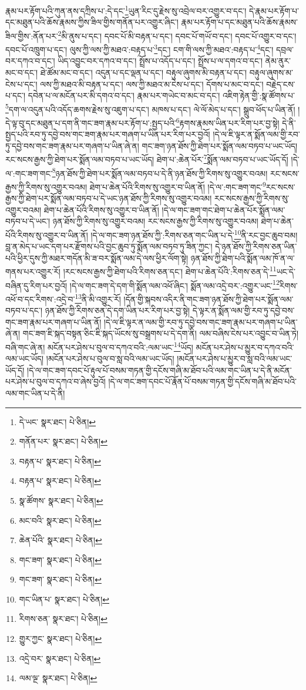 རྣམ་པར་རྟོག་པའི་ཀུན་ནས་དཀྲིས་པ་:དེ་དང་\footnote{དེ་ཡང་  སྣར་ཐང་།  པེ་ཅིན། }ཡུན་རིང་དུ་རྗེས་སུ་འབྲེལ་བར་འགྱུར་བ་དང་། དེ་རྣམ་པར་རྟོག་པ་དང་མཐུན་པའི་ཆོས་རྣམས་ཀྱིས་ཟིལ་གྱིས་གནོན་པར་འགྱུར་ཞིང་། རྣམ་པར་རྟོག་པ་དང་མཐུན་པའི་ཆོས་རྣམས་ཟིལ་གྱིས་:ནོན་པར་\footnote{གནོན་པར་  སྣར་ཐང་།  པེ་ཅིན། }མི་ནུས་པ་དང་། དབང་པོ་མི་བརྟན་པ་དང་། དབང་པོ་གཡོ་བ་དང་། དབང་པོ་འགྱུར་བ་དང་། དབང་པོ་འཁྲུག་པ་དང་། ལུས་ཀྱི་ལས་ཀྱི་མཐའ་:བརྟད་པ་\footnote{བརྟན་པ་  སྣར་ཐང་།  པེ་ཅིན། }དང་། ངག་གི་ལས་ཀྱི་མཐའ་:བརྟད་པ་\footnote{བརྟན་པ་  སྣར་ཐང་།  པེ་ཅིན། }དང་། དབྲལ་བར་དཀའ་བ་དང་། ཡིད་འབྱུང་བར་དཀའ་བ་དང་། སྤྲོས་པ་འདོད་པ་དང་། སྤྲོས་པ་ལ་དགའ་བ་དང་། ནེམ་ནུར་མང་བ་དང་། ཐེ་ཚོམ་མང་བ་དང་། འདུན་པ་དང་ལྡན་པ་དང་། བརྟུལ་ཞུགས་མི་བརྟན་པ་དང་། བརྟུལ་ཞུགས་མ་ངེས་པ་དང་། ལས་ཀྱི་མཐའ་མི་བརྟན་པ་དང་། ལས་ཀྱི་མཐའ་མ་ངེས་པ་དང་། དོགས་པ་མང་བ་དང་། བརྗེད་ངས་པ་དང་། དབེན་པ་ལ་མངོན་པར་མི་དགའ་བ་དང་། རྣམ་པར་གཡེང་བ་མང་བ་དང་། འཇིག་རྟེན་གྱི་:སྣ་ཚོགས་པ་\footnote{སྣ་ཚོགས་  སྣར་ཐང་།  པེ་ཅིན། }དག་ལ་འདུན་པའི་འདོད་ཆགས་རྗེས་སུ་འཇུག་པ་དང་། མཁས་པ་དང་། ལེ་ལོ་མེད་པ་དང་། སྒྲུབ་ཕོད་པ་ཡིན་ནོ། །དེ་ལྟ་བུ་དང་མཐུན་པ་དག་ནི་གང་ཟག་རྣམ་པར་རྟོག་པ་:སྤྱད་པའི་\footnote{མང་བའི་  སྣར་ཐང་།  པེ་ཅིན། }རྟགས་རྣམས་ཡིན་པར་རིག་པར་བྱ་སྟེ། དེ་ནི་སྤྱད་པའི་རབ་ཏུ་དབྱེ་བས་གང་ཟག་རྣམ་པར་གཞག་པ་ཡིན་པར་རིག་པར་བྱའོ། །དེ་ལ་ཇི་ལྟར་ན་སྨོན་ལམ་གྱི་རབ་ཏུ་དབྱེ་བས་གང་ཟག་རྣམ་པར་གཞག་པ་ཡིན་ཞེ་ན། གང་ཟག་ཉན་ཐོས་ཀྱི་ཐེག་པར་སྨོན་ལམ་བཏབ་པ་ཡང་ཡོད། རང་སངས་རྒྱས་ཀྱི་ཐེག་པར་སྨོན་ལམ་བཏབ་པ་ཡང་ཡོད། ཐེག་པ་:ཆེན་པོར་\footnote{ཆེན་པོའི་  སྣར་ཐང་།  པེ་ཅིན། }སྨོན་ལམ་བཏབ་པ་ཡང་ཡོད་དོ། །དེ་ལ་:གང་ཟག་གང་\footnote{གང་ཟག་  སྣར་ཐང་།  པེ་ཅིན། }ཉན་ཐོས་ཀྱི་ཐེག་པར་སྨོན་ལམ་བཏབ་པ་དེ་ནི་ཉན་ཐོས་ཀྱི་རིགས་སུ་འགྱུར་བའམ། རང་སངས་རྒྱས་ཀྱི་རིགས་སུ་འགྱུར་བའམ། ཐེག་པ་ཆེན་པོའི་རིགས་སུ་འགྱུར་བ་ཡིན་ནོ། །དེ་ལ་:གང་ཟག་གང་\footnote{གང་ཟག་  སྣར་ཐང་།  པེ་ཅིན། }རང་སངས་རྒྱས་ཀྱི་ཐེག་པར་སྨོན་ལམ་བཏབ་པ་དེ་ཡང་ཉན་ཐོས་ཀྱི་རིགས་སུ་འགྱུར་བའམ། རང་སངས་རྒྱས་ཀྱི་རིགས་སུ་འགྱུར་བའམ། ཐེག་པ་ཆེན་པོའི་རིགས་སུ་འགྱུར་བ་ཡིན་ནོ། །དེ་ལ་གང་ཟག་གང་ཐེག་པ་ཆེན་པོར་སྨོན་ལམ་བཏབ་པ་དེ་ཡང་། ཉན་ཐོས་ཀྱི་རིགས་སུ་འགྱུར་བའམ། རང་སངས་རྒྱས་ཀྱི་རིགས་སུ་འགྱུར་བའམ། ཐེག་པ་ཆེན་པོའི་རིགས་སུ་འགྱུར་བ་ཡིན་ནོ། །དེ་ལ་གང་ཟག་ཉན་ཐོས་ཀྱི་:རིགས་ཅན་གང་ཡིན་པ་དེ་\footnote{གང་ཡིན་པ་  སྣར་ཐང་།  པེ་ཅིན། }ནི་རང་བྱང་ཆུབ་བམ། བླ་ན་མེད་པ་ཡང་དག་པར་རྫོགས་པའི་བྱང་ཆུབ་ཏུ་སྨོན་ལམ་བཏབ་ཏུ་ཟིན་ཀྱང་། དེ་ཉན་ཐོས་ཀྱི་རིགས་ཅན་ཡིན་པའི་ཕྱིར་དུས་ཀྱི་མཐར་གདོན་མི་ཟ་བར་སྨོན་ལམ་དེ་ལས་ཕྱིར་ལོག་སྟེ། ཉན་ཐོས་ཀྱི་ཐེག་པའི་སྨོན་ལམ་ཁོ་ན་ལ་གནས་པར་འགྱུར་རོ། །རང་སངས་རྒྱས་ཀྱི་ཐེག་པའི་རིགས་ཅན་དང་། ཐེག་པ་ཆེན་པོའི་:རིགས་ཅན་དེ་\footnote{རིགས་ཅན་  སྣར་ཐང་།  པེ་ཅིན། }ཡང་དེ་བཞིན་དུ་རིག་པར་བྱའོ། །དེ་ལ་གང་ཟག་དེ་དག་གི་སྨོན་ལམ་འཕོ་ཞིང་། སྨོན་ལམ་འདྲེ་བར་:འགྱུར་ཡང་\footnote{གྱུར་ཀྱང་  སྣར་ཐང་།  པེ་ཅིན། }རིགས་འཕོ་བ་དང་རིགས་:འདྲེ་བ་\footnote{འདྲེ་བར་  སྣར་ཐང་།  པེ་ཅིན། }ནི་མི་འགྱུར་རོ། །དོན་གྱི་སྐབས་འདིར་ནི་གང་ཟག་ཉན་ཐོས་ཀྱི་ཐེག་པར་སྨོན་ལམ་བཏབ་པ་དང་། ཉན་ཐོས་ཀྱི་རིགས་ཅན་དེ་དག་ཡིན་པར་རིག་པར་བྱ་སྟེ། དེ་ལྟར་ན་སྨོན་ལམ་གྱི་རབ་ཏུ་དབྱེ་བས་གང་ཟག་རྣམ་པར་གཞག་པ་ཡིན་ནོ། །དེ་ལ་ཇི་ལྟར་ན་ལམ་གྱི་རབ་ཏུ་དབྱེ་བས་གང་ཟག་རྣམ་པར་གཞག་པ་ཡིན་ཞེ་ན། གང་ཟག་ཇི་སྐད་བསྟན་ཅིང་ཇི་སྐད་ཡོངས་སུ་བསྒྲགས་པ་དེ་དག་ནི། ལམ་བཞིས་ངེས་པར་འབྱུང་བ་ཡིན་ཏེ། བཞི་གང་ཞེ་ན། མངོན་པར་ཤེས་པ་བུལ་བ་དཀའ་བའི་:ལམ་ཡང་\footnote{ལམ་ལྔ་  སྣར་ཐང་།  པེ་ཅིན། }ཡོད། མངོན་པར་ཤེས་པ་མྱུར་བ་དཀའ་བའི་ལམ་ཡང་ཡོད། །མངོན་པར་ཤེས་པ་བུལ་བ་སླ་བའི་ལམ་ཡང་ཡོད། །མངོན་པར་ཤེས་པ་མྱུར་བ་སླ་བའི་ལམ་ཡང་ཡོད་དོ། །དེ་ལ་གང་ཟག་དབང་པོ་རྟུལ་པོ་བསམ་གཏན་གྱི་དངོས་གཞི་མ་ཐོབ་པའི་ལམ་གང་ཡིན་པ་དེ་ནི་མངོན་པར་ཤེས་པ་བུལ་བ་དཀའ་བ་ཞེས་བྱའོ། །དེ་ལ་གང་ཟག་དབང་པོ་རྣོན་པོ་བསམ་གཏན་གྱི་དངོས་གཞི་མ་ཐོབ་པའི་ལམ་གང་ཡིན་པ་དེ་ནི། 
